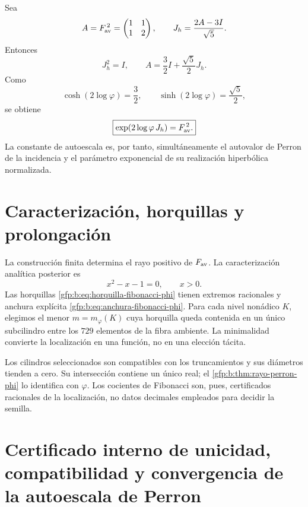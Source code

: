 Sea
\[
 A=F_{\rm av}^{\,2}=
 \begin{pmatrix}1&1\\1&2\end{pmatrix},
 \qquad
 J_h=\frac{2A-3I}{\sqrt5}.
\]
Entonces
\[
 J_h^2=I,
 \qquad
 A=\frac32I+\frac{\sqrt5}{2}J_h.
\]
Como
\[
 \cosh(2\log\varphi)=\frac32,
 \qquad
 \sinh(2\log\varphi)=\frac{\sqrt5}{2},
\]
se obtiene
\begin{equation}
 \boxed{
 \exp(2\log\varphi\,J_h)=F_{\rm av}^{\,2}.}
 \label{gfp:b:eq:realizacion-hiperbolica-phi}
\end{equation}
La constante de autoescala es, por tanto, simultáneamente el autovalor de
Perron de la incidencia y el parámetro exponencial de su realización
hiperbólica normalizada.

\section{Caracterización, horquillas y prolongación}

La construcción finita determina el rayo positivo de \(F_{\rm av}\). La
caracterización analítica posterior es
\[
 x^2-x-1=0,
 \qquad x>0.
\]
Las horquillas \eqref{gfp:b:eq:horquilla-fibonacci-phi} tienen extremos racionales
y anchura explícita \eqref{gfp:b:eq:anchura-fibonacci-phi}. Para cada nivel
nonádico \(K\), elegimos el menor \(m=m_{\varphi}(K)\) cuya horquilla queda
contenida en un único subcilindro entre los \(729\) elementos de la fibra
ambiente. La minimalidad convierte la localización en una función, no en una
elección tácita.

Los cilindros seleccionados son compatibles con los truncamientos y sus
diámetros tienden a cero. Su intersección contiene un único real; el
\cref{gfp:b:thm:rayo-perron-phi} lo identifica con \(\varphi\). Los cocientes de
Fibonacci son, pues, certificados racionales de la localización, no datos
decimales empleados para decidir la semilla.

\section{Certificado interno de unicidad, compatibilidad y convergencia de la autoescala de Perron}

